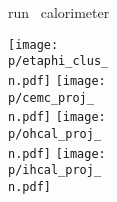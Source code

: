 \documentclass[UKenglish]{beamer}
\begin{document}
{\begin{frame}{run \n \, calorimeter}
{    \texttt{[image: \\p/etaphi\_clus\_\\n.pdf]}
    \texttt{[image: \\p/cemc\_proj\_\\n.pdf]}
    \texttt{[image: \\p/ohcal\_proj\_\\n.pdf]}
    \texttt{[image: \\p/ihcal\_proj\_\\n.pdf]}
    
    \hspace{0.3\textwidth}
    
    }
\end{frame}

}
\end{document}
